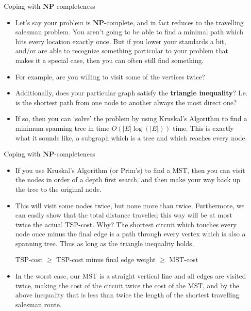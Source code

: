 \documentclass{beamer}
\begin{document}
\begin{frame}{Coping with $\mathbf{NP}$-completeness}
    \begin{itemize}
        \item Let's say your problem is $\mathbf{NP}$-complete, and in fact reduces to the travelling salesman problem. You aren't going to be able to find a minimal path which hits every location exactly once. But if you lower your standards a bit, and/or are able to recognize something particular to your problem that makes it a special case, then you can often still find something. 
        \item For example, are you willing to visit some of the vertices twice?
        \item Additionally, does your particular graph satisfy the \textbf{triangle inequality}? I.e. is the shortest path from one node to another always the most direct one? 
        \item If so, then you can `solve' the problem by using Kruskal's Algorithm to find a minimum spanning tree in time $O(|E|\log(|E|))$ time. This is exactly what it sounds like, a subgraph which is a tree and which reaches every node. 
    \end{itemize}
\end{frame}

\begin{frame}{Coping with $\mathbf{NP}$-completeness}
    \begin{itemize}
        \item If you use Kruskal's Algorithm (or Prim's) to find a MST, then you can visit the nodes in order of a depth first search, and then make your way back up the tree to the original node. 
        \item This will visit some nodes twice, but none more than twice. Furthermore, we can easily show that the total distance travelled this way will be at most twice the actual TSP-cost. Why? The shortest circuit which touches every node once minus the final edge is a path through every vertex which is also a spanning tree. Thus as long as the triangle inequality holds, 
        \begin{center}
            TSP-cost $\geq$ TSP-cost minus final edge weight $\geq$ MST-cost
        \end{center}
        \item In the worst case, our MST is a straight vertical line and all edges are visited twice, making the cost of the circuit twice the cost of the MST, and by the above inequality that is less than twice the length of the shortest travelling salesman route. 
    \end{itemize}
\end{frame}
\end{document}
